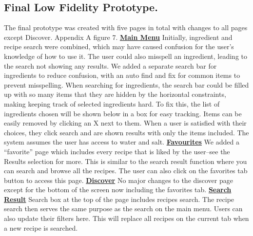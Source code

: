 \documentclass[11pt,english]{article}
\begin{document}
\subsection{Final Low Fidelity Prototype.}
The final prototype was created with five pages in total with changes to all pages except Discover.  Appendix A figure 7.
\newline
\newline
\textbf{\underline{Main Menu}}
\newline
\newline
Initially, ingredient and recipe search were combined, which may have caused confusion for the user’s knowledge of how to use it. The user could also misspell an ingredient, leading to the search not showing any results. We added a separate search bar for ingredients to reduce confusion, with an auto find and fix for common items to prevent misspelling. When searching for ingredients, the search bar could be filled up with so many items that they are hidden by the horizontal constraints, making keeping track of selected ingredients hard. To fix this, the list of ingredients chosen will be shown below in a box for easy tracking. Items can be easily removed by clicking an X next to them. When a user is satisfied with their choices, they click search and are shown results with only the items included. The system assumes the user has access to water and salt.
\newline
\newline
\textbf{\underline{Favourites}}
\newline
\newline
We added a “favorite” page which includes every recipe that is liked by the user–see the Results selection for more. This is similar to the search result function where you can search and browse all the recipes. The user can also click on the favorites tab button to access this page. 
\newline
\newline
\textbf{\underline{Discover}}
\newline
\newline
No major changes to the discover page except for the bottom of the screen now including the favorites tab.
\newline
\newline
\textbf{\underline{Search Result}}
\newline
\newline
Search box at the top of the page includes recipes search. The recipe search then serves the same purpose as the search on the main menu. Users can also update their filters here. This will replace all recipes on the current tab when a new recipe is searched.
\end{document}
